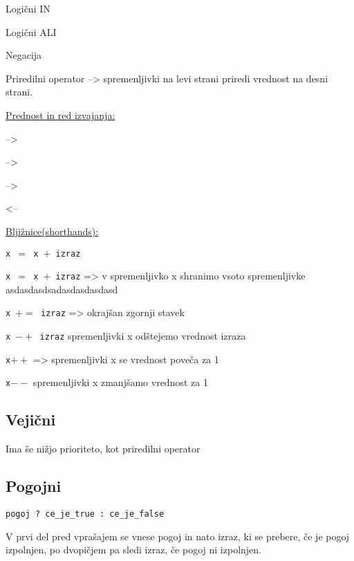 \begin{description}[align=left,labelwidth=3cm]
	\item [$\&\&$] Logični IN
	\item [$||$] Logični ALI
	\item [$!$] Negacija
	\item [$=$] Priredilni operator --> spremenljivki na levi strani priredi vrednost na desni strani.
\end{description}

\underline{Prednost in red izvajanja:}\

\begin{description}[align=left,labelwidth=3cm]
	\item [Aritmetični] --> 
	\item [Primerjalni] -->
	\item [Logični] -->
	\item [Priredilni] <--
\end{description}

\underline{Bljižnice(shorthands):}\

\begin{labeling}{\texttt{x $=$ x $+$ izraz}}
	\item [\texttt{x $=$ x $+$ izraz}] => v spremenljivko x shranimo vsoto spremenljivke asdasdasdsadasdasdasdasd
	\item [\texttt{x $+=$ izraz}] => okrajšan zgornji stavek
	\item[\texttt{x $-+$ izraz}] spremenljivki x odštejemo vrednost izraza
	\item [\texttt{x$++$}] => spremenljivki x se vrednost poveča za 1
	\item[\texttt{x$--$}] spremenljivki x zmanjšamo vrednost za 1
\end{labeling}

\subsection{Vejični}

Ima še nižjo prioriteto, kot priredilni operator

\subsection{Pogojni}
\texttt{pogoj ? ce\_je\_true : ce\_je\_false}

V prvi del pred vprašajem se vnese pogoj in nato izraz, ki se prebere, če je pogoj izpolnjen, po dvopičjem pa sledi izraz, če pogoj ni izpolnjen.

